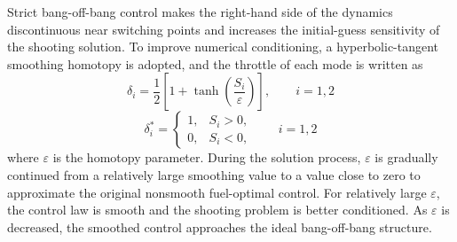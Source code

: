 \documentclass{IEEEtaes}
\begin{document}
Strict bang-off-bang control makes the right-hand side of the dynamics discontinuous near switching points and increases the initial-guess sensitivity of the shooting solution. To improve numerical conditioning, a hyperbolic-tangent smoothing homotopy is adopted, and the throttle of each mode is written as
\begin{equation}
\delta_i=\frac{1}{2}\left[1+\tanh\left(\frac{S_i}{\varepsilon}\right)\right],\qquad i=1,2
\end{equation}
\begin{equation}
\delta_i^{*}=\begin{cases}
1, & S_i>0,\\
0, & S_i<0,
\end{cases}\qquad i=1,2
\end{equation}
where $\varepsilon$ is the homotopy parameter. During the solution process, $\varepsilon$ is gradually continued from a relatively large smoothing value to a value close to zero to approximate the original nonsmooth fuel-optimal control. For relatively large $\varepsilon$, the control law is smooth and the shooting problem is better conditioned. As $\varepsilon$ is decreased, the smoothed control approaches the ideal bang-off-bang structure.
\end{document}
